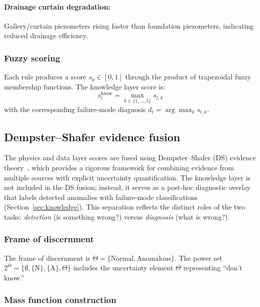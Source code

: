 \documentclass[preprint,12pt,review]{elsarticle}
\begin{document}
\paragraph{Drainage curtain degradation:} Gallery/curtain piezometers rising faster than foundation piezometers, indicating reduced drainage efficiency.

\subsubsection{Fuzzy scoring}

Each rule produces a score $s_k \in [0, 1]$ through the product of trapezoidal fuzzy membership functions. The knowledge layer score is:
\begin{equation}
s_t^{\mathrm{know}} = \max_{k \in \{1,\ldots,5\}} s_{t,k}
\label{eq:knowledge_score}
\end{equation}
with the corresponding failure-mode diagnosis $d_t = \arg\max_k s_{t,k}$.

\subsection{Dempster--Shafer evidence fusion}
\label{sec:fusion}

The physics and data layer scores are fused using Dempster--Shafer (DS) evidence theory~\cite{shafer1976mathematical,dempster1968generalization}, which provides a rigorous framework for combining evidence from multiple sources with explicit uncertainty quantification. The knowledge layer is not included in the DS fusion; instead, it serves as a post-hoc diagnostic overlay that labels detected anomalies with failure-mode classifications (Section~\ref{sec:knowledge}). This separation reflects the distinct roles of the two tasks: \emph{detection} (is something wrong?) versus \emph{diagnosis} (what is wrong?).

\subsubsection{Frame of discernment}

The frame of discernment is $\Theta = \{\text{Normal}, \text{Anomalous}\}$. The power set $2^\Theta = \{\emptyset, \{\text{N}\}, \{\text{A}\}, \Theta\}$ includes the uncertainty element $\Theta$ representing ``don't know.''

\subsubsection{Mass function construction}
\end{document}
